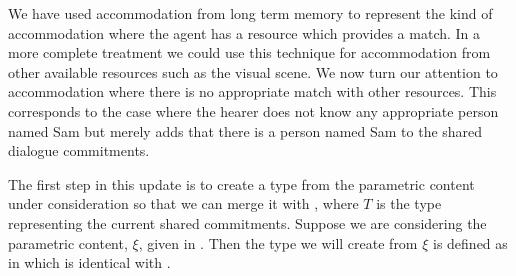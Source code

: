 We have used accommodation from long term memory to represent the kind
of accommodation where the agent has a resource which provides a
match.  In a more complete treatment we could use this technique for
accommodation from other available resources such as the visual scene.
We now turn our attention to accommodation where there is no
appropriate match
with other resources.  This corresponds to the case where the hearer
does not know any appropriate person named Sam but merely adds that
there is a person named Sam to the shared dialogue commitments.

The first step in this update is to create a type from the parametric
content under consideration so that we can merge it with
, where $T$ is the type
representing the current shared commitments.  
Suppose we are considering the parametric content, $\xi$, given in
.  Then the type we will create from $\xi$ is defined as in
 which is identical with .

